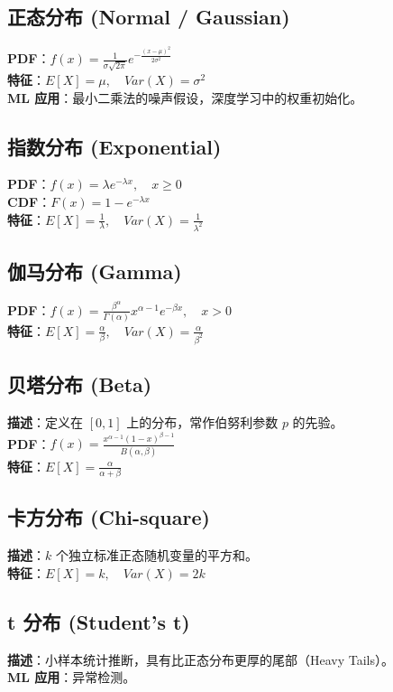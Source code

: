 \documentclass[12pt, a4paper]{article}
\begin{document}
\subsection{正态分布 (Normal / Gaussian)}
\textbf{PDF}：$f(x) = \frac{1}{\sigma\sqrt{2\pi}} e^{-\frac{(x-\mu)^2}{2\sigma^2}}$
\\ \textbf{特征}：$E[X] = \mu, \quad Var(X) = \sigma^2$
\\ \textbf{ML 应用}：最小二乘法的噪声假设，深度学习中的权重初始化。

\subsection{指数分布 (Exponential)}
\textbf{PDF}：$f(x) = \lambda e^{-\lambda x}, \quad x \ge 0$
\\ \textbf{CDF}：$F(x) = 1 - e^{-\lambda x}$
\\ \textbf{特征}：$E[X] = \frac{1}{\lambda}, \quad Var(X) = \frac{1}{\lambda^2}$

\subsection{伽马分布 (Gamma)}
\textbf{PDF}：$f(x) = \frac{\beta^\alpha}{\Gamma(\alpha)} x^{\alpha-1} e^{-\beta x}, \quad x > 0$
\\ \textbf{特征}：$E[X] = \frac{\alpha}{\beta}, \quad Var(X) = \frac{\alpha}{\beta^2}$

\subsection{贝塔分布 (Beta)}
\textbf{描述}：定义在 $[0, 1]$ 上的分布，常作伯努利参数 $p$ 的先验。
\\ \textbf{PDF}：$f(x) = \frac{x^{\alpha-1}(1-x)^{\beta-1}}{B(\alpha, \beta)}$
\\ \textbf{特征}：$E[X] = \frac{\alpha}{\alpha+\beta}$

\subsection{卡方分布 (Chi-square)}
\textbf{描述}：$k$ 个独立标准正态随机变量的平方和。
\\ \textbf{特征}：$E[X] = k, \quad Var(X) = 2k$

\subsection{t 分布 (Student's t)}
\textbf{描述}：小样本统计推断，具有比正态分布更厚的尾部（Heavy Tails）。
\\ \textbf{ML 应用}：异常检测。
\end{document}
